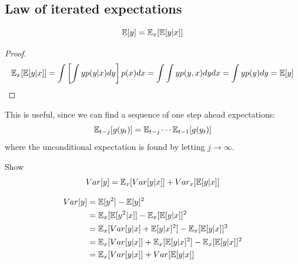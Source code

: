 \documentclass[DIV=14,titlepage=false]{scrreprt}
\begin{document}
\subsection{Law of iterated expectations}
\begin{definition}
    \[
        \mathbb{E}[y] = \mathbb{E}_x[\mathbb{E}[y|x]]
    \]
\end{definition}
\begin{proof}
    \[
        \mathbb{E}_x[\mathbb{E}[y|x]] = \int \left[ \int y p(y|x) dy \right] p(x) dx = \int \int y p(y,x) dy dx = \int y p(y) dy = \mathbb{E}[y]
    \]
\end{proof}
This is useful, since we can find a sequence of one step ahead expectations:
\[
    \mathbb{E}_{t-j}[g(y_t)] = \mathbb{E}_{t-j}\cdots \mathbb{E}_{t-1}[g(y_t)]
\]
where the unconditional expectation is found by letting $j \to \infty$.
\begin{exercise}
    Show
    \[
        Var[y] = \mathbb{E}_x[Var[y|x]] + Var_x[\mathbb{E}[y|x]]
    \]
\end{exercise}
\begin{solution}
\begin{align*}
    Var[y] &= \mathbb{E}[y^2] - \mathbb{E}[y]^2\\
    &= \mathbb{E}_x[\mathbb{E}[y^2|x]] - \mathbb{E}_x[\mathbb{E}[y|x]]^2\\
    &= \mathbb{E}_x[Var[y|x] + \mathbb{E}[y|x]^2] - \mathbb{E}_x[\mathbb{E}[y|x]]^2\\
    &= \mathbb{E}_x[Var[y|x]] + \mathbb{E}_x[\mathbb{E}[y|x]^2] - \mathbb{E}_x[\mathbb{E}[y|x]]^2\\
    &= \mathbb{E}_x[Var[y|x]] + Var[\mathbb{E}[y|x]]
\end{align*}
\end{solution}
\end{document}
